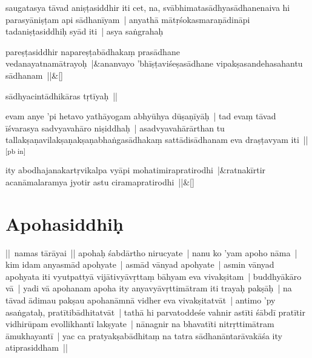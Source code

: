 \documentclass[article,a4paper]{memoir}
\begin{document}
	  \pstart saugatasya tā\-vad aniṣṭasiddhir iti cet, na, svā\-bhimatasā\-dhyasā\-dhanenaiva hi parasyā\-niṣṭam api sā\-dhanī\-yam | anyathā\- mā\-tṛśokasmaraṇā\-dinā\-pi tadaniṣṭasiddhiḥ syā\-d iti | asya saṅgrahaḥ
	\pend
      
	    
	    \stanza[\smallbreak]
pareṣṭasiddhir napareṣṭabā\-dhakaṃ prasā\-dhane vedanayatnamā\-trayoḥ |&ananvayo 'bhī\-ṣṭaviśeṣasā\-dhane vipakṣasandehasahantu sā\-dhanam ||\&[\smallbreak]


	\label{īsd-sādhyacintā}
	  
	

	  \pstart sā\-dhyacintā\-dhikā\-ras tṛtī\-yaḥ ||
	\pend
      

	  \pstart evam anye 'pi hetavo yathā\-yogam abhyū\-hya dū\-ṣaṇī\-yā\-ḥ | tad evaṃ tā\-vad ī\-śvarasya sadvyavahā\-ro niṣiddhaḥ | asadvyavahā\-rā\-rthan tu tallakṣaṇavilakṣaṇakṣaṇabhaṅgasā\-dhakaṃ sattā\-disā\-dhanam eva draṣṭavyam iti ||\leavevmode\textsuperscript{\rmlatinfont\tiny [pb in]}\label{RNAms_32B1}
	\pend
      
	    
	    \stanza[\smallbreak]
ity abodhajanakartṛvikalpa vyā\-pi mohatimirapratirodhi |&ratnakī\-rtir acanā\-malaramya jyotir astu ciramapratirodhi ||\&[\smallbreak]


	
	  
	
\section[{Apohasiddhiḥ}]{Apohasiddhiḥ}\label{Apohasiddhiḥ}

	  \pstart || namas tā\-rā\-yai || \label{thakur75-58.5} apohaḥ śabdā\-rtho nirucyate | nanu ko 'yam apoho nā\-ma | kim idam anyasmā\-d apohyate | asmā\-d vā\-nyad apohyate | asmin vā\-nyad apohyata iti vyutpattyā\- vijā\-tivyā\-vṛttaṃ bā\-hyam eva vivakṣitam | buddhyā\-kā\-ro vā\- | yadi vā\- apohanam apoha ity anyavyā\-vṛttimā\-tram iti trayaḥ pakṣā\-ḥ | \label{thakur75-58.9} na tā\-vad ā\-dimau pakṣau apohanā\-mnā\- vidher eva vivakṣitatvā\-t | antimo 'py asaṅgataḥ, pratī\-tibā\-dhitatvā\-t | tathā\- hi parvatoddeśe vahnir astī\-ti śā\-bdī\- pratī\-tir vidhirū\-pam evollikhantī\- lakṣyate | nā\-nagnir na bhavatī\-ti nitrṛttimā\-tram ā\-mukhayantī\- | yac ca pratyakṣabā\-dhitaṃ na tatra sā\-dhanā\-ntarā\-vakā\-śa ity atiprasiddham ||
	\pend
      
\end{document}
